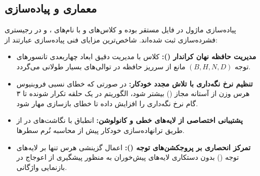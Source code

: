 \subsection{معماری و پیاده‌سازی}
پیاده‌سازی ماژول در فایل  مستقر بوده و کلاس‌های  و  با نام‌های ،  و  در رجیستری فشرده‌سازی ثبت شده‌اند. شاخص‌ترین مزایای فنی پیاده‌سازی عبارتند از:
\begin{itemize}
    \item \textbf{مدیریت حافظه نهان کراندار ():} کلاس  با مدیریت دقیق ابعاد چهاربعدی تانسورهای توجه $(B, H, N, D)$ مانع از سرریز حافظه در توالی‌های بسیار طولانی می‌گردد.
    \item \textbf{تنظیم نرخ نگه‌داری با تلاش مجدد خودکار:} در صورتی که خطای نسبی فروبنیوس هرس وزن از آستانه مجاز () بیشتر شود، الگوریتم در یک حلقه تکرار شونده تا ۳ گام نرخ نگه‌داری را افزایش داده تا خطای بازسازی مهار شود.
    \item \textbf{پشتیبانی اختصاصی از لایه‌های خطی و کانولوشن:} انطباق با نگاشت‌های  در  از طریق ترانهاده‌سازی خودکار پیش از محاسبه نُرم سطرها.
    \item \textbf{تمرکز انحصاری بر پروجکشن‌های توجه ():} اعمال گزینشی هرس تنها بر لایه‌های توجه () بدون دستکاری لایه‌های پیش‌خوران به منظور پیشگیری از اعوجاج در بازنمایی واژگانی.
\end{itemize}
